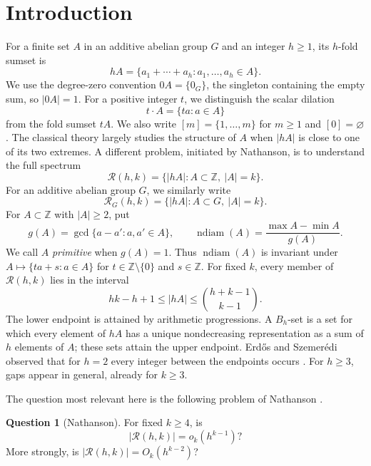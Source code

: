 \documentclass[11pt,reqno]{amsart}
\theoremstyle{definition}
\newtheorem{question}[theorem]{Question}
\theoremstyle{remark}
\newcommand{\Z}{\mathbb Z}
\newcommand{\Rcal}{\mathcal R}
\newcommand{\ndiam}{\operatorname{ndiam}}
\begin{document}
\section{Introduction}

For a finite set $A$ in an additive abelian group $G$ and an integer
$h\geq1$, its $h$-fold sumset is
\[
 hA=\{a_1+\cdots+a_h:a_1,\ldots,a_h\in A\}.
\]
We use the degree-zero convention $0A=\{0_G\}$, the singleton containing the
empty sum, so $|0A|=1$.
For a positive integer $t$, we distinguish the scalar dilation
\[
 t\mathbin{\cdot}A=\{ta:a\in A\}
\]
from the fold sumset $tA$.  We also write $[m]=\{1,\ldots,m\}$ for
$m\geq1$ and $[0]=\varnothing$.
The classical theory largely studies the structure of $A$ when $|hA|$ is
close to one of its two extremes.  A different problem, initiated by
Nathanson, is to understand the full spectrum
\[
 \Rcal(h,k)=\{|hA|:A\subset\Z,\ |A|=k\}.
\]
For an additive abelian group $G$, we similarly write
\[
 \Rcal_G(h,k)=\{|hA|:A\subset G,\ |A|=k\}.
\]
For $A\subset\mathbb Z$ with $|A|\geq2$, put
\[
 g(A)=\gcd\{a-a':a,a'\in A\},\qquad
 \ndiam(A)=\frac{\max A-\min A}{g(A)}.
\]
We call $A$ \emph{primitive} when $g(A)=1$.
Thus $\ndiam(A)$ is invariant under
$A\mapsto\{ta+s:a\in A\}$ for $t\in\mathbb Z\setminus\{0\}$ and
$s\in\mathbb Z$.
For fixed $k$, every member of $\Rcal(h,k)$ lies in the interval
\begin{equation}\label{eq:ambient}
 hk-h+1\leq |hA|\leq \binom{h+k-1}{k-1}.
\end{equation}
The lower endpoint is attained by arithmetic progressions.  A $B_h$-set is a
set for which every element of $hA$ has a unique nondecreasing
representation as a sum of $h$ elements of $A$; these sets attain the upper
endpoint.  Erd\H{o}s and Szemer\'{e}di observed that for $h=2$ every
integer between the endpoints occurs \cite{ErdosSzemeredi1983}.  For
 $h\geq3$, gaps appear in general, already for $k\geq3$.

The question most relevant here is the following problem of Nathanson
\cite[Problem~3]{NathansonTriangular}.

\begin{question}[Nathanson]\label{q:nathanson}
For fixed $k\geq4$, is
\[
 |\Rcal(h,k)|=o_k(h^{k-1})?
\]
More strongly, is $|\Rcal(h,k)|=O_k(h^{k-2})$?
\end{question}
\end{document}
